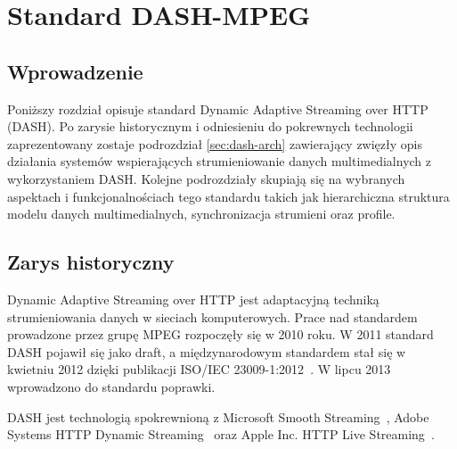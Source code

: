 \chapter{Standard DASH-MPEG}
\label{cha:rozdzial4}

\section{Wprowadzenie}
Poniższy rozdział opisuje standard Dynamic Adaptive Streaming over HTTP (DASH). Po zarysie historycznym i odniesieniu do pokrewnych technologii zaprezentowany zostaje podrozdział \ref{sec:dash-arch} zawierający zwięzły opis działania systemów wspierających strumieniowanie danych multimedialnych z wykorzystaniem DASH. Kolejne podrozdziały skupiają się na wybranych aspektach i funkcjonalnościach tego standardu takich jak hierarchiczna struktura modelu danych multimedialnych, synchronizacja strumieni oraz profile.

\section{Zarys historyczny}
Dynamic Adaptive Streaming over HTTP jest adaptacyjną techniką strumieniowania danych w sieciach komputerowych. Prace nad standardem prowadzone przez grupę MPEG rozpoczęły się w 2010 roku. W 2011 standard DASH pojawił się jako draft, a międzynarodowym standardem stał się w kwietniu 2012 dzięki publikacji ISO/IEC 23009-1:2012~\cite{ISO-IEC-DASH}. W lipcu 2013 wprowadzono do standardu poprawki.

DASH jest technologią spokrewnioną z Microsoft Smooth Streaming~\cite{MicroS}, Adobe Systems HTTP Dynamic Streaming~\cite{ADOBES} oraz Apple Inc. HTTP Live Streaming~\cite{APPLES}.

